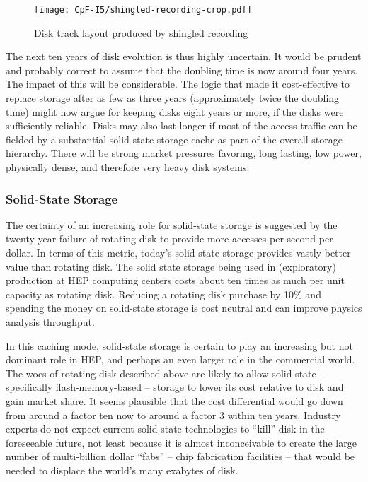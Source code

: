 \begin{figure}[h]
\centering
\texttt{[image: CpF-I5/shingled-recording-crop.pdf]}
\caption{Disk track layout produced by shingled recording}
\label{fig:shingled-recording}
\end{figure}

The next ten years of disk evolution is thus highly uncertain.  It would be 
prudent and probably correct to assume that the doubling time is now around four 
years.  The impact of this will be considerable.  The logic that made it 
cost-effective to replace storage after as few as three years (approximately 
twice the doubling time) might now argue for keeping disks eight years or more, 
if the disks were sufficiently reliable.  Disks may also last longer if most of 
the access traffic can be fielded by a substantial solid-state storage cache as 
part of the overall storage hierarchy. There will be strong market pressures 
favoring, long lasting, low power, physically dense, and therefore very heavy 
disk systems.

\subsubsection{Solid-State Storage}
The certainty of an increasing role for solid-state storage is suggested by 
the twenty-year failure of rotating disk to provide more accesses per second 
per dollar.  In terms of this metric, today’s solid-state storage provides 
vastly better value than rotating disk.  The solid state storage being used 
in (exploratory) production at HEP computing centers costs about ten times as 
much per unit capacity as rotating disk.  Reducing a rotating disk purchase 
by 10\% and spending the money on solid-state storage is cost neutral and can 
improve physics analysis throughput.

In this caching mode, solid-state storage is certain to play an increasing but not 
dominant role in HEP, and perhaps an even larger role in the commercial world.  
The woes of rotating disk described above are likely to allow solid-state -- 
specifically flash-memory-based -- storage to lower its cost relative to disk 
and gain market share.  It seems plausible that the cost differential would 
go down from around a factor ten now to around a factor 3 within ten years.  
Industry experts do not expect current solid-state technologies to “kill” disk 
in the foreseeable future, not least because it is almost inconceivable to 
create the large number of multi-billion dollar ``fabs'' -- chip fabrication 
facilities -- that would be needed to displace the world's many exabytes of disk.

